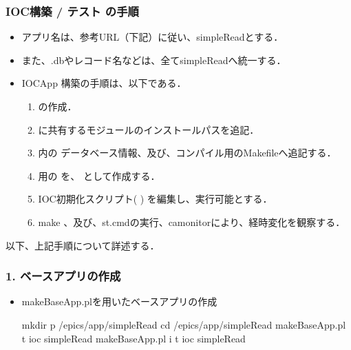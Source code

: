\documentclass[letterpaper,10pt,dvipdfmx]{sphinxmanual}
\begin{document}
\subsubsection{IOC構築 / テスト の手順}
\label{\detokenize{epics/rst/example2__arduino_ADConvertor:id3}}\begin{itemize}
\item {} 
アプリ名は、参考URL（下記）に従い、simpleReadとする．

\item {} 
また、.dbやレコード名などは、全てsimpleReadへ統一する．

\item {} 
IOC\sphinxhyphen{}App 構築の手順は、以下である．
\begin{enumerate}
%
\item {} 
 の作成．

\item {} 
 に共有するモジュールのインストールパスを追記．

\item {} 
 内の データベース情報、及び、コンパイル用のMakefileへ追記する．

\item {} 
 用の  を、  として作成する．

\item {} 
IOC初期化スクリプト(  ) を編集し、実行可能とする．

\item {} 
make 、及び、st.cmdの実行、camonitorにより、経時変化を観察する．

\end{enumerate}

\end{itemize}

以下、上記手順について詳述する．


\subsubsection{1. ベースアプリの作成}
\label{\detokenize{epics/rst/example2__arduino_ADConvertor:id4}}\begin{itemize}
\item {} 
makeBaseApp.plを用いたベースアプリの作成

\begin{sphinxVerbatim}[commandchars=\\\{\}]
\PYGZdl{} mkdir \PYGZhy{}p \PYGZti{}/epics/app/simpleRead
\PYGZdl{} cd  \PYGZti{}/epics/app/simpleRead
\PYGZdl{} makeBaseApp.pl \PYGZhy{}t ioc simpleRead
\PYGZdl{} makeBaseApp.pl \PYGZhy{}i \PYGZhy{}t ioc simpleRead
\end{sphinxVerbatim}

\end{itemize}
\end{document}
